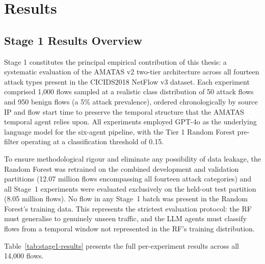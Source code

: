 \documentclass[../main.tex]{subfiles}
\begin{document}
\chapter{Results}
\label{ch:results}

\section{Stage 1 Results Overview}
\label{sec:results-overview}

Stage 1 constitutes the principal empirical contribution of this thesis: a systematic evaluation of the AMATAS v2 two-tier architecture across all fourteen attack types present in the CICIDS2018 NetFlow v3 dataset. Each experiment comprised 1,000 flows sampled at a realistic class distribution of 50 attack flows and 950 benign flows (a 5\% attack prevalence), ordered chronologically by source IP and flow start time to preserve the temporal structure that the AMATAS temporal agent relies upon. All experiments employed GPT-4o as the underlying language model for the six-agent pipeline, with the Tier 1 Random Forest pre-filter operating at a classification threshold of 0.15.

To ensure methodological rigour and eliminate any possibility of data leakage, the Random Forest was retrained on the combined development and validation partitions (12.07 million flows encompassing all fourteen attack categories) and all Stage~1 experiments were evaluated exclusively on the held-out test partition (8.05 million flows). No flow in any Stage~1 batch was present in the Random Forest's training data. This represents the strictest evaluation protocol: the RF must generalise to genuinely unseen traffic, and the LLM agents must classify flows from a temporal window not represented in the RF's training distribution.

Table~\ref{tab:stage1-results} presents the full per-experiment results across all 14,000 flows.
\end{document}
